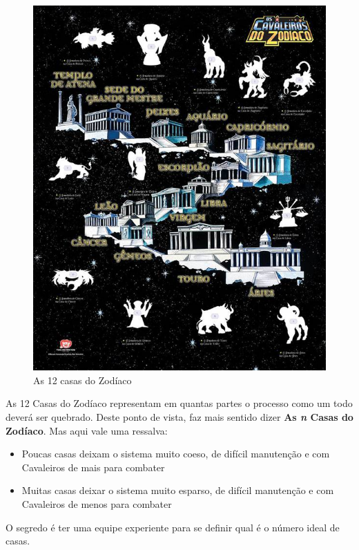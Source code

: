\begin{figure}[H]
    \centering
    \includegraphics[scale=0.55,keepaspectratio=true]{images/11.jpg}
    \caption{As 12 casas do Zodíaco}
\end{figure}

As 12 Casas do Zodíaco representam em quantas partes o processo como um todo deverá ser quebrado. Deste ponto de vista, faz mais sentido dizer \textbf{As \emph{n} Casas do Zodíaco}. Mas aqui vale uma ressalva: 
\begin{itemize}
    \item Poucas casas deixam o sistema muito coeso, de difícil manutenção e com Cavaleiros de mais para combater
    \item Muitas casas deixar o sistema muito esparso, de difícil manutenção e com Cavaleiros de menos para combater
\end{itemize}

O segredo é ter uma equipe experiente para se definir qual é o número ideal de casas.

